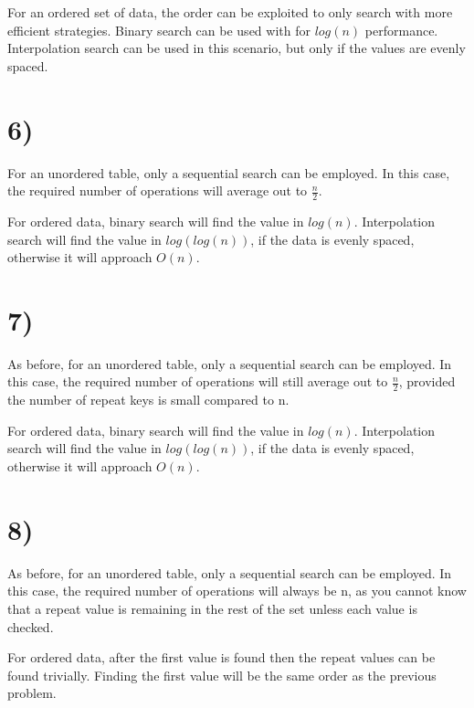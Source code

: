 \documentclass[a4paper,11pt]{article}
\begin{document}
For an ordered set of data, the order can be exploited to only search with more efficient strategies.  Binary search can be
used with for $log(n)$ performance.  Interpolation search can be used in this scenario, but only if the values are evenly
spaced.  


\section*{6)}
For an unordered table, only a sequential search can be employed.  In this case, the required number of operations
will average out to $\frac{n}{2}$.

For ordered data, binary search will find the value in $log(n)$.  Interpolation search will find the value in $log(log(n))$,
if the data is evenly spaced, otherwise it will approach $O(n)$.


\section*{7)}
As before, for an unordered table, only a sequential search can be employed.  In this case, the required 
number of operations will still average out to $\frac{n}{2}$, provided the number of repeat keys is small 
compared to n.  

For ordered data, binary search will find the value in $log(n)$.  Interpolation search will find the value in $log(log(n))$,
if the data is evenly spaced, otherwise it will approach $O(n)$.


\section*{8)}
As before, for an unordered table, only a sequential search can be employed.  In this case, the required 
number of operations will always be n, as you cannot know that a repeat value is remaining in the rest of the set unless
each value is checked.  

For ordered data, after the first value is found then the repeat values can be found trivially.  Finding the first value will be
the same order as the previous problem.

\end{document}
